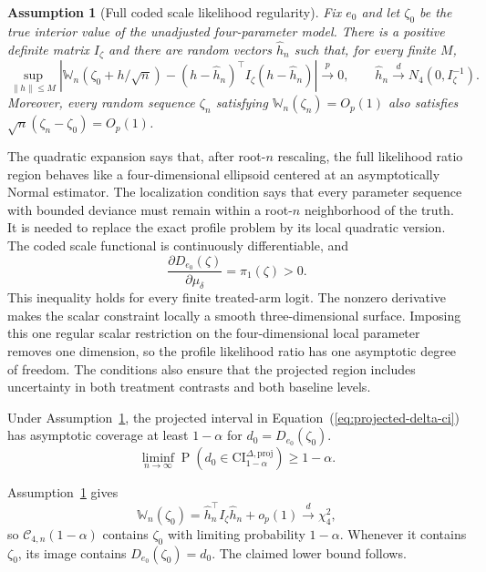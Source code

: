 \documentclass[11pt]{article}
\DeclareMathOperator{\Prob}{P}
\newtheorem{assumption}{Assumption}
\begin{document}
\begin{assumption}[Full coded scale likelihood regularity]\label{ass:delta-full-lr}
Fix $e_0$ and let $\zeta_0$ be the true interior value of the unadjusted four-parameter model. There is a positive definite matrix $I_\zeta$ and there are random vectors $\widehat{h}_n$ such that, for every finite $M$,
\[
  \sup_{\lVert h\rVert\leq M}
  \left|
    \mathbb{W}_n(\zeta_0+h/\sqrt n)
    -(h-\widehat{h}_n)^\top I_\zeta(h-\widehat{h}_n)
  \right|
  \overset{p}{\longrightarrow}0,
  \qquad
  \widehat{h}_n\overset{d}{\longrightarrow}N_4(0,I_\zeta^{-1}).
\]
Moreover, every random sequence $\zeta_n$ satisfying $\mathbb{W}_n(\zeta_n)=O_p(1)$ also satisfies $\sqrt n(\zeta_n-\zeta_0)=O_p(1)$.
\end{assumption}

The quadratic expansion says that, after root-$n$ rescaling, the full likelihood ratio region behaves like a four-dimensional ellipsoid centered at an asymptotically Normal estimator. The localization condition says that every parameter sequence with bounded deviance must remain within a root-$n$ neighborhood of the truth. It is needed to replace the exact profile problem by its local quadratic version. The coded scale functional is continuously differentiable, and
\[
  \frac{\partial D_{e_0}(\zeta)}{\partial\mu_\delta}
  =\pi_1(\zeta)>0.
\]
This inequality holds for every finite treated-arm logit. The nonzero derivative makes the scalar constraint locally a smooth three-dimensional surface. Imposing this one regular scalar restriction on the four-dimensional local parameter removes one dimension, so the profile likelihood ratio has one asymptotic degree of freedom. The conditions also ensure that the projected region includes uncertainty in both treatment contrasts and both baseline levels.

\begin{mainproposition}\label{prop:delta-projected-lr-range}
Under Assumption~\ref{ass:delta-full-lr}, the projected interval in Equation~(\ref{eq:projected-delta-ci}) has asymptotic coverage at least $1-\alpha$ for $d_0=D_{e_0}(\zeta_0)$.
\[
  \liminf_{n\to\infty}
  \Prob(d_0\in\mathrm{CI}^{\Delta,\mathrm{proj}}_{1-\alpha})
  \geq 1-\alpha.
\]
\end{mainproposition}

\begin{mainproof}
Assumption~\ref{ass:delta-full-lr} gives
\[
  \mathbb{W}_n(\zeta_0)
  =
  \widehat{h}_n^\top I_\zeta\widehat{h}_n+o_p(1)
  \overset{d}{\longrightarrow}\chi^2_4,
\]
so $\mathcal{C}_{4,n}(1-\alpha)$ contains $\zeta_0$ with limiting probability $1-\alpha$. Whenever it contains $\zeta_0$, its image contains $D_{e_0}(\zeta_0)=d_0$. The claimed lower bound follows.
\end{mainproof}
\end{document}
